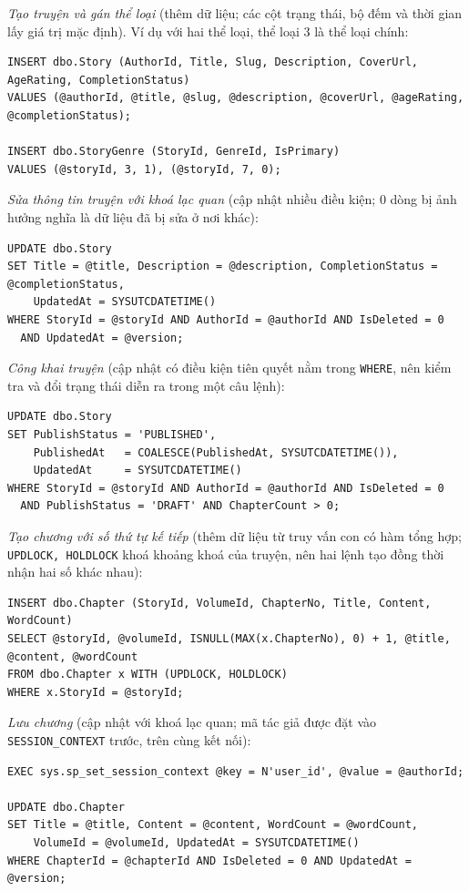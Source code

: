 \textit{Tạo truyện và gán thể loại} (thêm dữ liệu; các cột trạng thái, bộ đếm và thời gian lấy giá trị mặc định). Ví dụ với hai thể loại, thể loại 3 là thể loại chính:
\begin{verbatim}
INSERT dbo.Story (AuthorId, Title, Slug, Description, CoverUrl, AgeRating, CompletionStatus)
VALUES (@authorId, @title, @slug, @description, @coverUrl, @ageRating, @completionStatus);

INSERT dbo.StoryGenre (StoryId, GenreId, IsPrimary)
VALUES (@storyId, 3, 1), (@storyId, 7, 0);
\end{verbatim}

\textit{Sửa thông tin truyện với khoá lạc quan} (cập nhật nhiều điều kiện; 0 dòng bị ảnh hưởng nghĩa là dữ liệu đã bị sửa ở nơi khác):
\begin{verbatim}
UPDATE dbo.Story
SET Title = @title, Description = @description, CompletionStatus = @completionStatus,
    UpdatedAt = SYSUTCDATETIME()
WHERE StoryId = @storyId AND AuthorId = @authorId AND IsDeleted = 0
  AND UpdatedAt = @version;
\end{verbatim}

\textit{Công khai truyện} (cập nhật có điều kiện tiên quyết nằm trong \texttt{WHERE}, nên kiểm tra và đổi trạng thái diễn ra trong một câu lệnh):
\begin{verbatim}
UPDATE dbo.Story
SET PublishStatus = 'PUBLISHED',
    PublishedAt   = COALESCE(PublishedAt, SYSUTCDATETIME()),
    UpdatedAt     = SYSUTCDATETIME()
WHERE StoryId = @storyId AND AuthorId = @authorId AND IsDeleted = 0
  AND PublishStatus = 'DRAFT' AND ChapterCount > 0;
\end{verbatim}

\textit{Tạo chương với số thứ tự kế tiếp} (thêm dữ liệu từ truy vấn con có hàm tổng hợp; \texttt{UPDLOCK, HOLDLOCK} khoá khoảng khoá của truyện, nên hai lệnh tạo đồng thời nhận hai số khác nhau):
\begin{verbatim}
INSERT dbo.Chapter (StoryId, VolumeId, ChapterNo, Title, Content, WordCount)
SELECT @storyId, @volumeId, ISNULL(MAX(x.ChapterNo), 0) + 1, @title, @content, @wordCount
FROM dbo.Chapter x WITH (UPDLOCK, HOLDLOCK)
WHERE x.StoryId = @storyId;
\end{verbatim}

\textit{Lưu chương} (cập nhật với khoá lạc quan; mã tác giả được đặt vào \texttt{SESSION\_CONTEXT} trước, trên cùng kết nối):
\begin{verbatim}
EXEC sys.sp_set_session_context @key = N'user_id', @value = @authorId;

UPDATE dbo.Chapter
SET Title = @title, Content = @content, WordCount = @wordCount,
    VolumeId = @volumeId, UpdatedAt = SYSUTCDATETIME()
WHERE ChapterId = @chapterId AND IsDeleted = 0 AND UpdatedAt = @version;
\end{verbatim}

